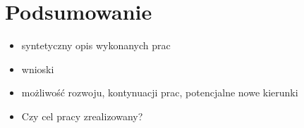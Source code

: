 \documentclass[a4paper,twoside,12pt]{book}
\newcounter{stronyPozaNumeracja}
\begin{document}
\chapter{Podsumowanie}
\begin{itemize}
\item syntetyczny opis wykonanych prac
\item wnioski
\item możliwość rozwoju, kontynuacji prac, potencjalne nowe kierunki
\item Czy cel pracy zrealizowany? 
\end{itemize}


\backmatter
{}
\setcounter{page}{\value{stronyPozaNumeracja}}

\pagestyle{tylkoNumeryStron}

\printbibliography           %
\end{document}
